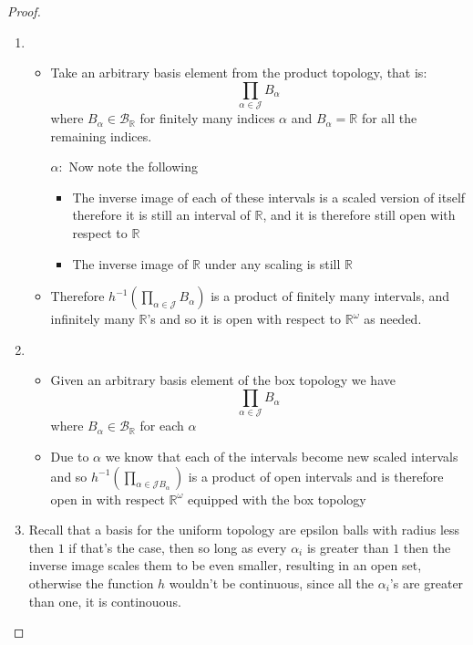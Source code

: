 \begin{proof}
    \begin{enumerate}
        \item 
        \begin{itemize}
            \item Take an arbitrary basis element from the product topology, that is: 
            \[
            \prod_{\alpha \in \mathcal{ J } } B_{\alpha}
            \]
            where $B_{\alpha} \in \mathcal{ B } _{\mathbb{R} }$ for finitely many indices $\alpha$ and $B_{\alpha}=\mathbb{R} $ for all the remaining indices.
        \item[$ \alpha:$]  Now note the following
            \begin{itemize}
                \item The inverse image of each of these intervals is a scaled version of itself therefore it is still an interval of $ \mathbb{R}  $, and it is therefore still open with respect to $ \mathbb{R}$ 
                \item The inverse image of $ \mathbb{R}  $ under any scaling is still $ \mathbb{R}  $ 
            \end{itemize}
            \item Therefore $ h ^{-1} \left( \prod _{ \alpha  \in \mathcal{ J }   } B _{ \alpha  }  \right)  $ is a product of finitely many intervals, and infinitely many $ \mathbb{R}  $'s and so it is open with respect to $ \mathbb{R} ^{ \omega  }  $ as needed.
        \end{itemize}
        \item 
        \begin{itemize}
            \item Given an arbitrary basis element of the box topology we have
            \[
            \prod_{\alpha \in \mathcal{ J } } B_{\alpha}
            \]
            where $B_{\alpha} \in \mathcal{B}_{ \mathbb{R} }$ for each $\alpha$
            \item Due to $ \alpha  $ we know that each of the intervals become new scaled intervals and so $ h ^{-1} \left( \prod _{ \alpha \in \mathcal{ J } B _{ \alpha  }   }  \right)  $ is a product of open intervals and is therefore open in with respect $ \mathbb{R} ^{ \omega  }  $ equipped with the box topology 
        \end{itemize}
        \item Recall that a basis for the uniform topology are epsilon balls with radius less then $ 1 $ if that's the case, then so long as every $ \alpha _{ i }  $ is greater than $ 1 $ then the inverse image scales them to be even smaller, resulting in an open set, otherwise the function $ h $ wouldn't be continuous, since all the $ \alpha _{ i }  $'s are greater than one, it is continouous.
    \end{enumerate}
\end{proof}
